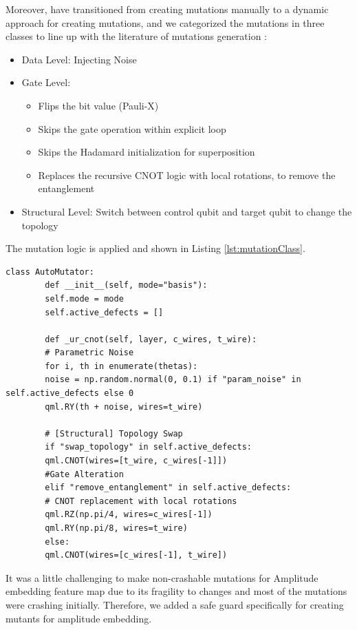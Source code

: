 \documentclass[12pt,a4paper]{article}
\begin{document}
	Moreover,  have transitioned from creating mutations manually to a dynamic approach for creating mutations, and we categorized the mutations in three classes to line up with the literature of mutations generation \cite{9844849, qMutphyFortunato}:
	\begin{itemize}
		\item Data Level: Injecting Noise
		\item Gate Level: 
		\begin{itemize}
			\item  Flips the bit value (Pauli-X)
			\item Skips the gate operation within explicit loop
			\item Skips the Hadamard initialization for superposition
			\item Replaces the recursive CNOT logic with local rotations, to remove the entanglement
		\end{itemize}
		\item Structural Level: Switch between control qubit and target qubit to change the topology
	\end{itemize}
	
	The mutation logic is applied and shown in Listing \ref{lst:mutationClass}.
	
	
	
	\begin{lstlisting}[caption=Dynamic Mutator Sample, label={lst:mutationClass}]
		class AutoMutator:
		def __init__(self, mode="basis"):
		self.mode = mode
		self.active_defects = [] 
		
		def _ur_cnot(self, layer, c_wires, t_wire):
		# Parametric Noise
		for i, th in enumerate(thetas):
		noise = np.random.normal(0, 0.1) if "param_noise" in self.active_defects else 0
		qml.RY(th + noise, wires=t_wire)
		
		# [Structural] Topology Swap
		if "swap_topology" in self.active_defects:
		qml.CNOT(wires=[t_wire, c_wires[-1]])
		#Gate Alteration
		elif "remove_entanglement" in self.active_defects:
		# CNOT replacement with local rotations
		qml.RZ(np.pi/4, wires=c_wires[-1]) 
		qml.RY(np.pi/8, wires=t_wire)
		else:
		qml.CNOT(wires=[c_wires[-1], t_wire])
	\end{lstlisting}
	
	It was a little challenging to make non-crashable mutations for Amplitude embedding feature map due to its fragility to changes and most of the mutations were crashing initially. Therefore, we added a safe guard specifically for creating mutants for amplitude embedding. 
	
\end{document}
